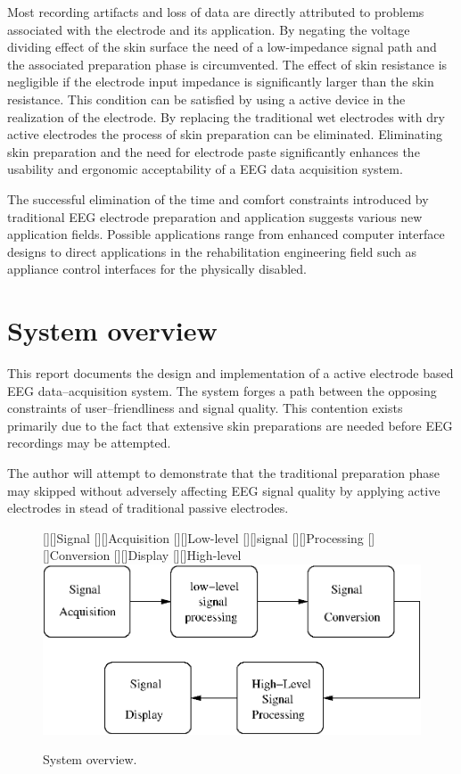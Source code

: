 Most recording artifacts and loss of data are directly attributed to
problems associated with the electrode and its application. By
negating the voltage dividing effect of the skin surface the need of a
low-impedance signal path and the associated preparation phase is
circumvented. The effect of skin resistance is negligible if the
electrode input impedance is significantly larger than the skin
resistance. This condition can be satisfied by using a active device
in the realization of the electrode. By replacing the traditional wet
electrodes with dry active electrodes the process of skin preparation
can be eliminated. Eliminating skin preparation and the need for
electrode paste significantly enhances the usability and ergonomic
acceptability of a EEG data acquisition system.


The successful elimination of the time and comfort constraints
introduced by traditional EEG electrode preparation and application
suggests various new application fields. Possible applications range
from enhanced computer interface designs to direct applications in the
rehabilitation engineering field such as appliance control interfaces
for the physically disabled.


\section{System overview}
This report documents the design and implementation of a active
electrode based EEG data--acquisition system. The system forges a path
between the opposing constraints of user--friendliness and signal
quality. This contention exists primarily due to the fact that
extensive skin preparations are needed before EEG recordings may be
attempted.

The author will attempt to demonstrate that the traditional
preparation phase may skipped without adversely affecting EEG signal
quality by applying active electrodes in stead of traditional passive
electrodes.


\begin{figure}[h]
		[][]{Signal}
		[][]{Acquisition}
		[][]{Low-level}
		[][]{signal}
		[][]{Processing}
		[][]{Conversion}
		[][]{Display}
		[][]{High-level}
        \includegraphics[width=\textwidth]{./overview.eps} 
        \caption{System overview.}
        \label{fig:overview}
\end{figure}

